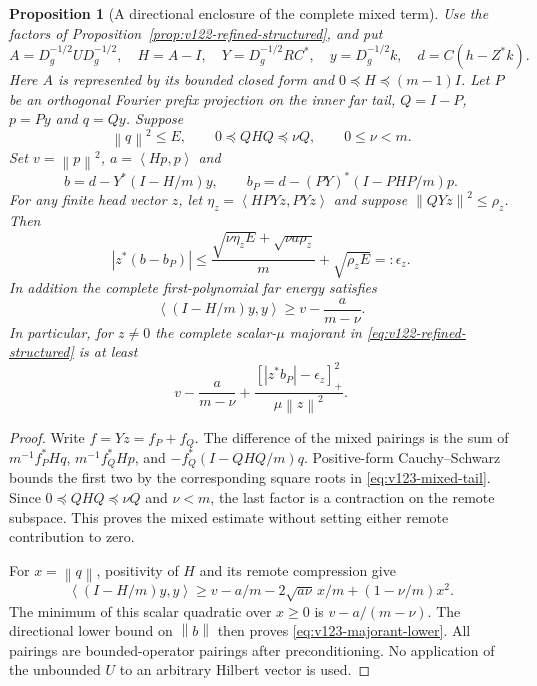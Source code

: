 \documentclass[11pt]{article}
\newtheorem{proposition}[theorem]{Proposition}
\theoremstyle{remark}
\newcommand{\norm}[1]{\left\lVert #1\right\rVert}
\newcommand{\ip}[2]{\left\langle #1,#2\right\rangle}
\begin{document}
\begin{proposition}[A directional enclosure of the complete mixed term]
\label{prop:v123-mixed-tail}
Use the factors of Proposition~\ref{prop:v122-refined-structured},
and put
\[
 A=D_g^{-1/2}UD_g^{-1/2},\quad H=A-I,\quad
 Y=D_g^{-1/2}RC^*,\quad y=D_g^{-1/2}k,\quad d=C(h-Z^*k).
\]
Here $A$ is represented by its bounded closed form and
$0\preceq H\preceq(m-1)I$. Let $P$ be an orthogonal Fourier
prefix projection on the inner far tail, $Q=I-P$, $p=Py$ and
$q=Qy$. Suppose
\[
 \norm q^2\le E,\qquad 0\preceq QHQ\preceq\nu Q,
 \qquad 0\le\nu<m.
\]
Set $v=\norm p^2$, $a=\ip{Hp}{p}$ and
\[
 b=d-Y^*(I-H/m)y,\qquad
 b_P=d-(PY)^*(I-PHP/m)p.
\]
For any finite head vector $z$, let
$\eta_z=\ip{H PYz}{PYz}$ and suppose
$\norm{QYz}^2\le\rho_z$. Then
\begin{equation}\label{eq:v123-mixed-tail}
 |z^*(b-b_P)|\le
 \frac{\sqrt{\nu\eta_z E}+\sqrt{\nu a\rho_z}}{m}
       +\sqrt{\rho_z E}=:\epsilon_z.
\end{equation}
In addition the complete first-polynomial far energy satisfies
\begin{equation}\label{eq:v123-far-lower}
 \ip{(I-H/m)y}{y}\ge v-\frac{a}{m-\nu}.
\end{equation}
In particular, for $z\ne0$ the complete scalar-$\mu$ majorant
in \eqref{eq:v122-refined-structured} is at least
\begin{equation}\label{eq:v123-majorant-lower}
 v-\frac{a}{m-\nu}
 +\frac{[|z^*b_P|-\epsilon_z]_+^2}{\mu\norm z^2}.
\end{equation}
\end{proposition}
\begin{proof}
Write $f=Yz=f_P+f_Q$. The difference of the mixed pairings is
the sum of $m^{-1}f_P^*Hq$, $m^{-1}f_Q^*Hp$, and
$-f_Q^*(I-QHQ/m)q$. Positive-form Cauchy--Schwarz bounds the
first two by the corresponding square roots in
\eqref{eq:v123-mixed-tail}. Since $0\preceq QHQ\preceq\nu Q$
and $\nu<m$, the last factor is a contraction on the remote
subspace. This proves the mixed estimate without setting either
remote contribution to zero.

For $x=\norm q$, positivity of $H$ and its remote compression give
\[
 \ip{(I-H/m)y}{y}
 \ge v-a/m-2\sqrt{a\nu}\,x/m+(1-\nu/m)x^2.
\]
The minimum of this scalar quadratic over $x\ge0$ is
$v-a/(m-\nu)$. The directional lower bound on $\norm b$
then proves \eqref{eq:v123-majorant-lower}. All pairings are
bounded-operator pairings after preconditioning. No application
of the unbounded $U$ to an arbitrary Hilbert vector is used.
\end{proof}
\end{document}
